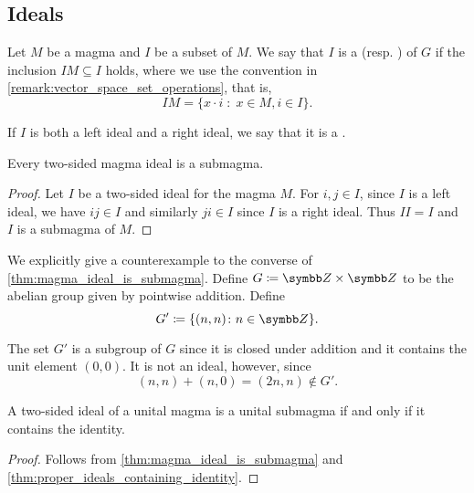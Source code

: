 \subsection{Ideals}\label{subsec:ideals}

\begin{definition}\label{def:magma_ideal}
  Let \( M \) be a magma and \( I \) be a subset of \( M \). We say that \( I \) is a  (resp. ) of \( G \) if the inclusion \( IM \subseteq I \) holds, where we use the convention in \cref{remark:vector_space_set_operations}, that is,
  \begin{equation*}
    IM = \{ x \cdot i \;\colon\; x \in M, i \in I \}.
  \end{equation*}

  If \( I \) is both a left ideal and a right ideal, we say that it is a .
\end{definition}

\begin{proposition}\label{thm:magma_ideal_is_submagma}
  Every two-sided magma ideal is a submagma.
\end{proposition}
\begin{proof}
  Let \( I \) be a two-sided ideal for the magma \( M \). For \( i, j \in I \), since \( I \) is a left ideal, we have \( ij \in I \) and similarly \( ji \in I \) since \( I \) is a right ideal. Thus \( II = I \) and \( I \) is a submagma of \( M \).
\end{proof}

\begin{example}\label{ex:subgroup_is_not_ideal}
  We explicitly give a counterexample to the converse of \cref{thm:magma_ideal_is_submagma}. Define \( G \coloneqq \Z \times \Z \) to be the abelian group given by pointwise addition. Define
  \begin{equation*}
    G' \coloneqq \{ (n, n) \colon n \in \Z \}.
  \end{equation*}

  The set \( G' \) is a subgroup of \( G \) since it is closed under addition and it contains the unit element \( (0, 0) \). It is not an ideal, however, since
  \begin{equation*}
    (n, n) + (n, 0) = (2n, n) \not\in G'.
  \end{equation*}
\end{example}

\begin{proposition}\label{thm:unital_magma_ideal_is_submagma_iff_contains_identity}
  A two-sided ideal of a unital magma is a unital submagma if and only if it contains the identity.
\end{proposition}
\begin{proof}
  Follows from \cref{thm:magma_ideal_is_submagma} and \cref{thm:proper_ideals_containing_identity}.
\end{proof}

